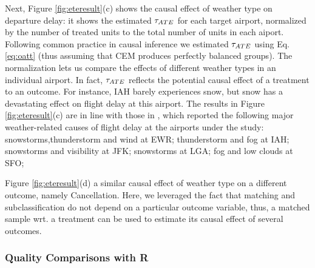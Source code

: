 Next, Figure \ref{fig:eteresult}(c) shows the causal effect of weather
type on departure delay: it shows the estimated ${\tau_{ATE}}$ for each target
airport, normalized by the number of treated units to the total number
of units in each aiport.  Following common practice in causal
inference we estimated ${\tau_{ATE}}$ using Eq. \ref{eq:oatt} (thus assuming
that CEM produces perfectly balanced groups). The normalization lets
us compare the effects of different weather types in an individual
airport. In fact, ${\tau_{ATE}}$ reflects the potential causal effect of a
treatment to an outcome. For instance, IAH barely experiences snow,
but snow has a devastating effect on flight delay at this airport. The
results in Figure \ref{fig:eteresult}(c) are in line with those in
\cite{weather}, which reported the following major weather-related
causes of flight delay at the airports under the study:
snowstorms,thunderstorm and wind at EWR; thunderstorm and fog at IAH;
snowstorms and visibility at JFK; snowstorms at LGA; fog and low
clouds at SFO;


Figure \ref{fig:eteresult}(d) a similar causal effect of weather type
on a different outcome, namely Cancellation. Here, we leveraged the
fact that matching and subclassification do not depend on a particular
outcome variable, thus, a matched sample wrt. a treatment can be used
to estimate its causal effect of several outcomes.

















\vspace{-.3cm}
\subsubsection{Quality Comparisons with R}



